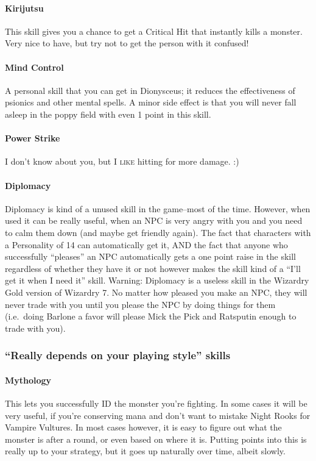 \documentclass[12pt]{article}
\let\oldparagraph\paragraph
\renewcommand{\paragraph}[1]{\oldparagraph{#1}\mbox{}}
\begin{document}
\paragraph{Kirijutsu} This skill gives you a chance to get a Critical Hit
that instantly kills a monster. Very nice to have, but try not to get the
person with it confused!

\paragraph{Mind Control} A personal skill that you can get in Dionysceus; it
reduces the effectiveness of psionics and other mental spells. A minor side
effect is that you will never fall asleep in the poppy field with even 1
point in this skill.

\paragraph{Power Strike} I don't know about you, but I \textsc{like} hitting
for more damage. :)

\paragraph{Diplomacy} Diplomacy is kind of a unused skill in the game--most
of the time. However, when used it can be really useful, when an NPC is very
angry with you and you need to calm them down (and maybe get friendly
again). The fact that characters with a Personality of 14 can automatically
get it, AND the fact that anyone who successfully ``pleases'' an NPC
automatically gets a one point raise in the skill regardless of whether they
have it or not however makes the skill kind of a ``I'll get it when I need
it'' skill. Warning: Diplomacy is a useless skill in the Wizardry Gold
version of Wizardry 7. No matter how pleased you make an NPC, they will never
trade with you until you please the NPC by doing things for them (i.e.~doing
Barlone a favor will please Mick the Pick and Ratsputin enough to trade with
you).

\subsubsection{\texorpdfstring{``Really depends on your playing style''
skills}{Really depends on your playing style skills}}\label{really-depends-on-your-playing-style-skills}

\paragraph{Mythology} This lets you successfully ID the monster you're
fighting. In some cases it will be very useful, if you're conserving mana and
don't want to mistake Night Rooks for Vampire Vultures. In most cases
however, it is easy to figure out what the monster is after a round, or even
based on where it is. Putting points into this is really up to your strategy,
but it goes up naturally over time, albeit slowly.
\end{document}
